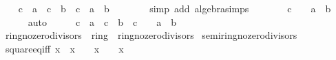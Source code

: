 \begin{isabellebody}
\isanewline
\ \ \isamarkupfalse%
\ {\isachardoublequoteopen}c\ {\isacharasterisk}{\kern0pt}\ a\ {\isacharequal}{\kern0pt}\ c\ {\isacharasterisk}{\kern0pt}\ b\ {\isasymlongleftrightarrow}\ c\ {\isacharasterisk}{\kern0pt}\ {\isacharparenleft}{\kern0pt}a\ {\isacharminus}{\kern0pt}\ b{\isacharparenright}{\kern0pt}\ {\isacharequal}{\kern0pt}\ {}{\isachardoublequoteclose}\isanewline
\ \ \ \ \isamarkupfalse%
\ {\isacharparenleft}{\kern0pt}simp\ add{\isacharcolon}{\kern0pt}\ algebra{\isacharunderscore}{\kern0pt}simps{\isacharparenright}{\kern0pt}\isanewline
\ \ \isamarkupfalse%
\ \isamarkupfalse%
\ {\isachardoublequoteopen}{\isasymdots}\ {\isasymlongleftrightarrow}\ c\ {\isacharequal}{\kern0pt}\ {}\ {\isasymor}\ a\ {\isacharequal}{\kern0pt}\ b{\isachardoublequoteclose}\isanewline
\ \ \ \ \isamarkupfalse%
\ auto\isanewline
\ \ \isamarkupfalse%
\ \isamarkupfalse%
\ {\isachardoublequoteopen}c\ {\isacharasterisk}{\kern0pt}\ a\ {\isacharequal}{\kern0pt}\ c\ {\isacharasterisk}{\kern0pt}\ b\ {\isasymlongleftrightarrow}\ c\ {\isacharequal}{\kern0pt}\ {}\ {\isasymor}\ a\ {\isacharequal}{\kern0pt}\ b{\isachardoublequoteclose}\ \isacommand{{\isachardot}{\kern0pt}}\isamarkupfalse%
\isanewline
{}\isamarkupfalse%
%
\endisatagproof
{\isafoldproof}%
%
\isadelimproof
\isanewline
%
\endisadelimproof
\isanewline
{}\isamarkupfalse%
\isanewline
\isanewline
{}\isamarkupfalse%
\ ring{\isacharunderscore}{\kern0pt}{}{\isacharunderscore}{\kern0pt}no{\isacharunderscore}{\kern0pt}zero{\isacharunderscore}{\kern0pt}divisors\ {\isacharequal}{\kern0pt}\ ring{\isacharunderscore}{\kern0pt}{}\ {\isacharplus}{\kern0pt}\ ring{\isacharunderscore}{\kern0pt}no{\isacharunderscore}{\kern0pt}zero{\isacharunderscore}{\kern0pt}divisors\isanewline
{}\isanewline
\isanewline
{}\isamarkupfalse%
\ semiring{\isacharunderscore}{\kern0pt}{}{\isacharunderscore}{\kern0pt}no{\isacharunderscore}{\kern0pt}zero{\isacharunderscore}{\kern0pt}divisors%
\isadelimproof
\ %
\endisadelimproof
%
\isatagproof
\isacommand{{\isachardot}{\kern0pt}{\isachardot}{\kern0pt}}\isamarkupfalse%
%
\endisatagproof
{\isafoldproof}%
%
\isadelimproof
%
\endisadelimproof
\isanewline
\isanewline
{}\isamarkupfalse%
\ square{\isacharunderscore}{\kern0pt}eq{\isacharunderscore}{\kern0pt}{}{\isacharunderscore}{\kern0pt}iff{\isacharcolon}{\kern0pt}\ {\isachardoublequoteopen}x\ {\isacharasterisk}{\kern0pt}\ x\ {\isacharequal}{\kern0pt}\ {}\ {\isasymlongleftrightarrow}\ x\ {\isacharequal}{\kern0pt}\ {}\ {\isasymor}\ x\ {\isacharequal}{\kern0pt}\ {\isacharminus}{\kern0pt}\ {}{\isachardoublequoteclose}\isanewline

\end{isabellebody}
